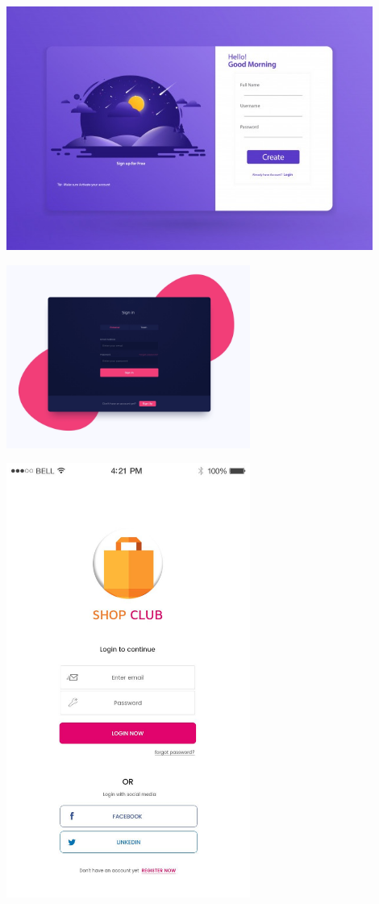 \documentclass[]{article}
\begin{document}
\begin{center}
\includegraphics[width=0.9\textwidth]{images/image11.png}
\end{center}

\begin{center}
\includegraphics[width=0.6\textwidth]{images/image12.png}
\end{center}

\begin{center}
\includegraphics[width=0.6\textwidth]{images/image8.png}
\end{center}
\end{document}

